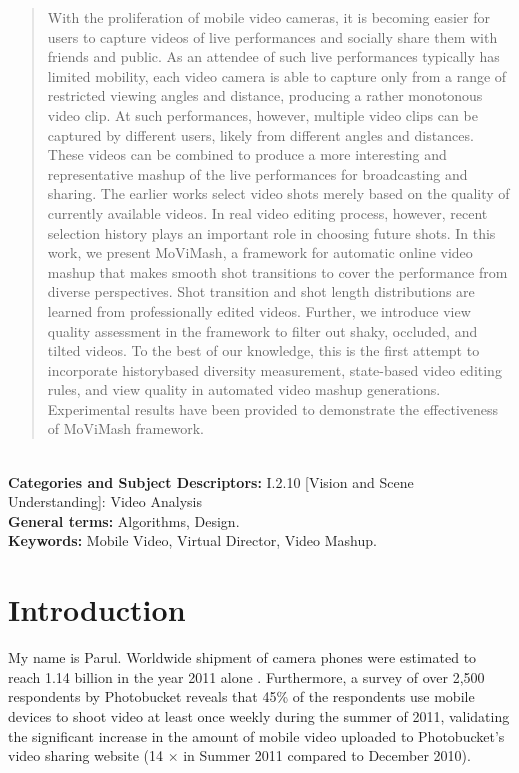 \documentclass{sig-alternate}
\begin{document}
\maketitle
\begin{abstract}
With the proliferation of mobile video cameras, it is becoming easier
for users to capture videos of live performances and socially
share them with friends and public. As an attendee of such live
performances typically has limited mobility, each video camera is
able to capture only from a range of restricted viewing angles and
distance, producing a rather monotonous video clip. At such performances,
however, multiple video clips can be captured by different
users, likely from different angles and distances. These videos
can be combined to produce a more interesting and representative
mashup of the live performances for broadcasting and sharing. The
earlier works select video shots merely based on the quality of currently
available videos. In real video editing process, however, recent
selection history plays an important role in choosing future
shots. In this work, we present MoViMash, a framework for automatic
online video mashup that makes smooth shot transitions to
cover the performance from diverse perspectives. Shot transition
and shot length distributions are learned from professionally edited
videos. Further, we introduce view quality assessment in the framework
to filter out shaky, occluded, and tilted videos. To the best
of our knowledge, this is the first attempt to incorporate historybased
diversity measurement, state-based video editing rules, and
view quality in automated video mashup generations. Experimental
results have been provided to demonstrate the effectiveness of
MoViMash framework.
\end{abstract}\\
\textbf{Categories and Subject Descriptors:} I.2.10 [Vision and Scene Understanding]: Video Analysis\\
\textbf{General terms:} Algorithms, Design.\\
\textbf{Keywords:} Mobile Video, Virtual Director, Video Mashup.


\section{Introduction}\label{intro}
My name is Parul.
Worldwide shipment of camera phones were estimated to reach
1.14 billion in the year 2011 alone \cite{1}. Furthermore, a survey of over 2,500 respondents by Photobucket reveals that 45\% of the respondents use mobile devices to shoot video at least once weekly during the summer of 2011, validating the significant increase in
the amount of mobile video uploaded to Photobucket's video sharing
website (14 $\times$ in Summer 2011 compared to December 2010)\cite{2}.
\end{document}
